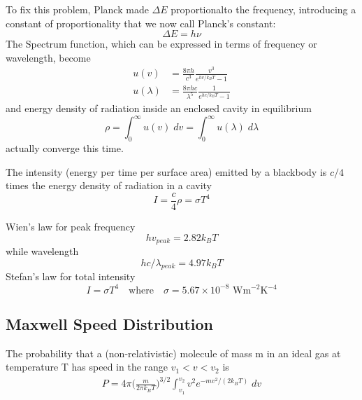 \documentclass[../../../main.tex]{subfiles}
\begin{document}
To fix this problem, Planck made $\Delta E$ proportionalto the frequency, introducing a constant of proportionality that we now call Planck's constant:
\begin{equation*}
    \Delta E= h\nu
\end{equation*}
The Spectrum function, which can be expressed in terms of frequency or wavelength, become
\begin{align*}
    u(v)&=\frac{8\pi h}{c^3}\frac{v^3}{e^{hv/k_BT}-1}\\
    u(\lambda)&=\frac{8\pi hc}{\lambda^5}\frac{1}{e^{hc/k_BT}-1}
\end{align*}
and energy density of radiation inside an enclosed cavity in equilibrium
\begin{equation*}
    \rho=\int_{0}^{\infty}u(v)\;dv=\int_{0}^{\infty}u(\lambda)\;d\lambda
\end{equation*}
actually converge this time.

The intensity (energy per time per surface area) emitted by a blackbody is $c/4 $times the energy density of radiation in a cavity
\begin{equation*}
    I=\frac{c}{4}\rho=\sigma T^4
\end{equation*}

Wien's law for peak frequency
\begin{equation*}
    hv_{peak} = 2.82 k_B T
\end{equation*}
while wavelength
\begin{equation*}
    hc/\lambda_{peak} = 4.97 k_B T
\end{equation*}
Stefan's law for total intensity 
\begin{equation*}
    I=\sigma T^4\quad\text{where}\quad \sigma= 5.67 \times 10^{-8} \text{ Wm$^{-2}$K$^{-4}$}
\end{equation*}

\subsection{Maxwell Speed Distribution}
The probability that a (non-relativistic) molecule of mass m in an ideal gas at temperature T has speed in the range $v_1 < v < v_2$ is
\begin{eqnarray}
    P=4\pi \biggl(\frac{m}{2\pi k_BT}\biggr)^{3/2} \int_{v_1}^{v_2}v^2e^{-mv^2/(2k_B T)}\;dv
\end{eqnarray}
\end{document}
